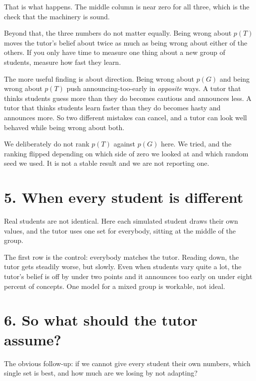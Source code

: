 \documentclass[11pt]{article}
\begin{document}


\noindent That is what happens. The middle column is near zero for all
three, which is the check that the machinery is sound.

Beyond that, the three numbers do not matter equally. Being wrong about
$p(T)$ moves the tutor's belief about twice as much as being wrong about
either of the others. If you only have time to measure one thing about a
new group of students, measure how fast they learn.

The more useful finding is about direction. Being wrong about $p(G)$ and
being wrong about $p(T)$ push announcing-too-early in \emph{opposite}
ways. A tutor that thinks students guess more than they do becomes
cautious and announces less. A tutor that thinks students learn faster
than they do becomes hasty and announces more. So two different mistakes
can cancel, and a tutor can look well behaved while being wrong about both.

We deliberately do not rank $p(T)$ against $p(G)$ here. We tried, and the
ranking flipped depending on which side of zero we looked at and which
random seed we used. It is not a stable result and we are not reporting
one.

\section*{5. When every student is different}

Real students are not identical. Here each simulated student draws their
own values, and the tutor uses one set for everybody, sitting at the
middle of the group.



\noindent The first row is the control: everybody matches the tutor.
Reading down, the tutor gets steadily worse, but slowly. Even when
students vary quite a lot, the tutor's belief is off by under two points
and it announces too early on under eight percent of concepts. One model
for a mixed group is workable, not ideal.

\section*{6. So what should the tutor assume?}

The obvious follow-up: if we cannot give every student their own numbers,
which single set is best, and how much are we losing by not adapting?
\end{document}
